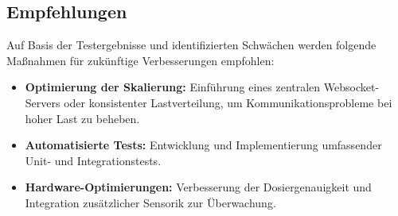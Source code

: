 \subsection{Empfehlungen}
Auf Basis der Testergebnisse und identifizierten Schwächen werden folgende Maßnahmen für zukünftige 
Verbesserungen empfohlen:
\begin{itemize}
  \item \textbf{Optimierung der Skalierung:} Einführung eines zentralen Websocket-Servers oder 
  konsistenter Lastverteilung, um Kommunikationsprobleme bei hoher Last zu beheben.
  \item \textbf{Automatisierte Tests:} Entwicklung und Implementierung umfassender \\
  Unit- und Integrationstests.
  \item \textbf{Hardware-Optimierungen:} Verbesserung der Dosiergenauigkeit und Integration 
  zusätzlicher Sensorik zur Überwachung.
\end{itemize}

